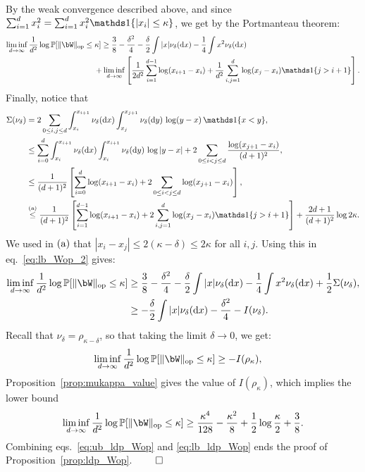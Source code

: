 By the weak convergence described above, and since $\sum_{i=1}^d x_i^2 = \sum_{i=1}^d x_i^2 \indi\{|x_i| \leq \kappa\}$, we get by the Portmanteau theorem:
\begin{align}\label{eq:lb_Wop_2}
    \liminf_{d \to \infty} \frac{1}{d^2} \log \bbP[\|\bW\|_\op \leq \kappa]  
    &\geq \frac{3}{8} - \frac{\delta^2}{4} - \frac{\delta}{2} \int |x| \nu_\delta(\rd x) - \frac{1}{4} \int x^2 \nu_\delta(\rd x) \\
    \nonumber
    &\hspace{-9pt}+ \liminf_{d \to \infty}\left[\frac{1}{2d^2} \sum_{i=1}^{d-1} \log (x_{i+1} - x_i) + \frac{1}{d^2} \sum_{i,j=1}^d \log(x_j - x_i) \indi\{j > i+1\}
    \right].
\end{align}
Finally, notice that 
\begin{align*}
    \Sigma(\nu_\delta) &= 2 \sum_{0 \leq i,j \leq d} \int_{x_i}^{x_{i+1}} \nu_\delta(\rd x) \int_{x_j}^{x_{j+1}} \nu_\delta(\rd y) \, \log (y-x) \, \indi\{x < y\}, \\ 
    &\leq \sum_{i=0}^d \int_{x_i}^{x_{i+1}} \nu_\delta(\rd x) \int_{x_i}^{x_{i+1}} \nu_\delta(\rd y) \, \log |y-x| + 2 \sum_{0 \leq i < j \leq d} \frac{\log(x_{j+1} - x_i)}{(d+1)^2}, \\
    &\leq \frac{1}{(d+1)^2} \left[\sum_{i=0}^d \log(x_{i+1}-x_i) + 2 \sum_{0 \leq i < j \leq d} \log(x_{j+1} - x_i)\right], \\ 
    &\aleq \frac{1}{(d+1)^2} \left[\sum_{i=1}^{d-1} \log(x_{i+1}-x_i) + 2 \sum_{i,j=1}^d \log(x_j - x_i) \indi\{j > i+1\} \right] + \frac{2d+1}{(d+1)^2} \log 2 \kappa.
\end{align*}
We used in $(\rm a)$ that $|x_i - x_j| \leq 2 (\kappa-\delta) \leq 2\kappa$ for all $i,j$.
Using this in eq.~\eqref{eq:lb_Wop_2} gives:
\begin{align*}
    \liminf_{d \to \infty} \frac{1}{d^2} \log \bbP[\|\bW\|_\op \leq \kappa]  
    &\geq \frac{3}{8} - \frac{\delta^2}{4} - \frac{\delta}{2} \int |x| \nu_\delta(\rd x) - \frac{1}{4} \int x^2 \nu_\delta(\rd x) + \frac{1}{2} \Sigma(\nu_\delta), \\
    &\geq - \frac{\delta}{2} \int |x| \nu_\delta(\rd x)  - \frac{\delta^2}{4} - I(\nu_\delta).
\end{align*}
Recall that $\nu_\delta = \rho_{\kappa - \delta}$, so that taking the limit $\delta \to 0$, we get:
\begin{align*}
    \liminf_{d \to \infty} \frac{1}{d^2} \log\bbP[\|\bW\|_\op \leq \kappa] 
    &\geq - I(\rho_\kappa),
\end{align*}
Proposition~\ref{prop:mukappa_value} gives the value of $I(\rho_\kappa)$, which implies the lower bound
\begin{align}\label{eq:lb_ldp_Wop}
        \liminf_{d \to \infty} \frac{1}{d^2} \log \bbP[\|\bW\|_\op \leq \kappa] 
        \geq \frac{\kappa^4}{128} - \frac{\kappa^2}{8} + \frac{1}{2} \log \frac{\kappa}{2} + \frac{3}{8}.
\end{align}
Combining eqs.~\eqref{eq:ub_ldp_Wop} and \eqref{eq:lb_ldp_Wop} ends the proof of Proposition~\ref{prop:ldp_Wop}.
$\qed$

